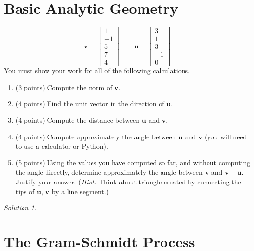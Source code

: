 \documentclass{article}
\theoremstyle{remark}
\newtheorem*{solution}{Solution}
\newcommand{\vv}[1]{\mathbf{#1}}
\begin{document}
\section{Basic Analytic Geometry}
\begin{displaymath}
  \vv v =
  \begin{bmatrix}
    1 \\ -1 \\ 5 \\ 7 \\ 4
  \end{bmatrix}
  \qquad
  \vv u =
  \begin{bmatrix}
    3 \\ 1 \\ 3 \\ -1 \\ 0
  \end{bmatrix}
\end{displaymath}
You must show your work for all of the following calculations.
\begin{enumerate}
\item (3 points) Compute the norm of $\vv v$.
\item (4 points) Find the unit vector in the direction of $\vv u$.
\item (4 points) Compute the distance between $\vv u$ and $\vv v$.
\item (4 points) Compute approximately the angle between $\vv u$ and $\vv v$ (you will need to use a calculator or Python).
\item (5 points) Using the values you have computed so far, and without computing the angle directly, determine approximately the angle between $\vv v$ and $\vv v - \vv u$. Justify your answer. (\textit{Hint.} Think about triangle created by connecting the tips of $\vv u$, $\vv v$ by a line segment.)
\end{enumerate}

\medskip

\begin{solution}
\end{solution}

\pagebreak
\section{The Gram-Schmidt Process}
\end{document}
